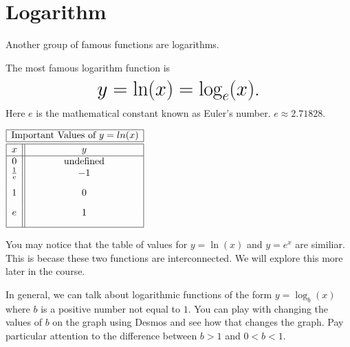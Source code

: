 \documentclass[nooutcomes]{ximera}
\begin{document}
\newpage


\section{Logarithm}
Another group of famous functions are logarithms.

\begin{example}
The most famous logarithm function is
 $$ \mbox{\huge $y=\ln(x)=\log_{e}(x)$.}$$ 
Here $e$ is the mathematical constant known as Euler's number. $e \approx 2.71828$.

\begin{image}
\end{image}

\begin{center}
\(
\begin{array}{ |c || c|  }
 \hline
 \multicolumn{2}{|c|}{\text{\normalfont Important Values of } y=ln(x)} \\
\hline
 \hline
 x & y\\
 \hline
0&\text{\normalfont undefined}\\ 
\frac{1}{e}&-1\\ [2ex]
1&0\\[2ex]
 e&1\\[2ex]
 \hline
\end{array}
\)
\end{center}

\end{example}

You may notice that the table of values for $y=\ln(x)$ and $y=e^x$ are similiar.  This is becase these two functions are interconnected.  We will explore this more later in the course.

In general, we can talk about logarithmic functions of the form $y=\log_b(x)$ where $b$ is a positive number not equal to $1$.  You can play with changing the values of $b$ on the graph using Desmos and see how that changes the graph.  Pay particular attention to the difference between $b>1$ and $0<b<1$.

\begin{center}  
\end{center}
\end{document}
